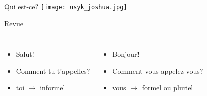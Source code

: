 \documentclass{beamer}
\begin{document}
  \begin{frame}{Qui est-ce? }
    \centering
    \texttt{[image: usyk\_joshua.jpg]}


  \end{frame}

  \begin{frame}{Revue}
    \begin{columns}
        \begin{itemize}
          \item Salut!
          \item Comment tu t'appelles?
          \item toi $\to$ informel
        \end{itemize}
        \begin{itemize}
          \item Bonjour!
          \item Comment vous appelez-vous?
          \item vous $\to$ formel ou pluriel
        \end{itemize}
    \end{columns}
  \end{frame}
\end{document}
